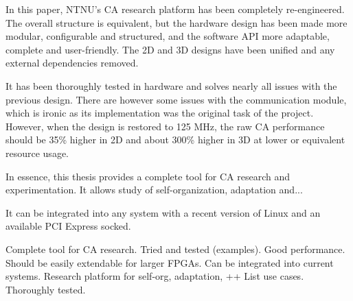 In this paper, NTNU's CA research platform has been completely re-engineered.
The overall structure is equivalent, but the hardware design has been made more modular, configurable and structured, and the software API more adaptable, complete and user-friendly.
The 2D and 3D designs have been unified and any external dependencies removed.

It has been thoroughly tested in hardware and solves nearly all issues with the previous design.
There are however some issues with the communication module, which is ironic as its implementation was the original task of the project.
However, when the design is restored to 125 MHz, the raw CA performance should be 35\% higher in 2D and about 300\% higher in 3D at lower or equivalent resource usage.

In essence, this thesis provides a complete tool for CA research and experimentation.
It allows study of self-organization, adaptation and... \TODO

It can be integrated into any system with a recent version of Linux and an available PCI Express socked.

Complete tool for CA research.
Tried and tested (examples).
Good performance.
Should be easily extendable for larger FPGAs.
Can be integrated into current systems.
Research platform for self-org, adaptation, ++
List use cases.
Thoroughly tested.
